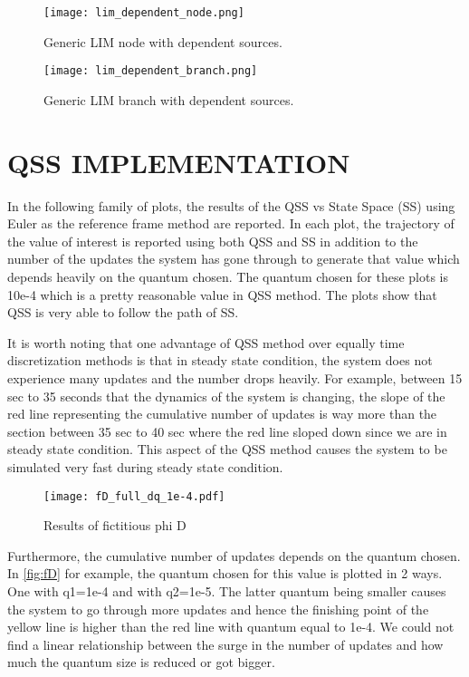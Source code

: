 \documentclass{scspaperproc}
\theoremstyle{scsthe}
\begin{document}
\begin{figure}[htb]
    \centering
    \texttt{[image: lim\_dependent\_node.png]}
    \caption{Generic LIM node with dependent sources.}
    \label{fig:lim_dependent_node}
\end{figure}

\begin{figure}[htb]
    \centering
    \texttt{[image: lim\_dependent\_branch.png]}
    \caption{Generic LIM branch with dependent sources.}
     \label{fig:lim_dependent_branch}
\end{figure}

\section{QSS IMPLEMENTATION}
In the following family of plots, the results of the QSS vs State Space (SS) using Euler as the reference frame method are reported. In each plot, the trajectory of the value of interest is reported using both QSS and SS in addition to the number of the updates the system has gone through to generate that value which depends heavily on the quantum chosen. The quantum chosen for these plots is 10e-4 which is a pretty reasonable value in QSS method. The plots show that QSS is very able to follow the path of SS. 

It is worth noting that one advantage of QSS method over equally time discretization methods is that in steady state condition, the system does not experience many updates and the number drops heavily. For example, between 15 sec to 35 seconds that the dynamics of the system is changing, the slope of the red line representing the cumulative number of updates is way more than the section between 35 sec to 40 sec where the red line sloped down since we are in steady state condition. This aspect of the QSS method causes the system to be simulated very fast during steady state condition. 
 \begin{figure}[H] 
    \FloatBarrier
    \centering
    \texttt{[image: fD\_full\_dq\_1e-4.pdf]}
    \caption{Results of fictitious phi D}
    \label{fig:fD}
\end{figure}

Furthermore, the cumulative number of updates depends on the quantum chosen. In \autoref{fig:fD} for example, the quantum chosen for this value is plotted in 2 ways. One with q1=1e-4 and with q2=1e-5. The latter quantum being smaller causes the system to go through more updates and hence the finishing point of the yellow line is higher than the red line with quantum equal to 1e-4. We could not find a linear relationship between the surge in the number of updates and how much the quantum size is reduced or got bigger. 
\end{document}
